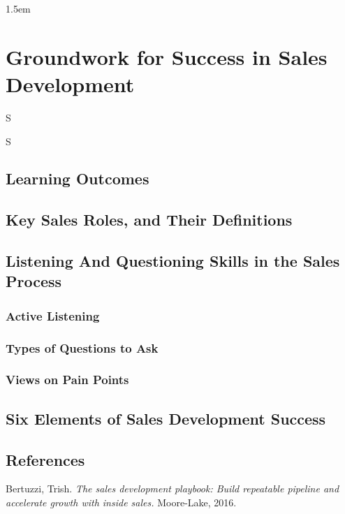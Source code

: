\frenchspacing
{1.5em}
\chapter{Groundwork for Success in Sales Development}
\epigraph{S}{S}

%
\section{Learning Outcomes}
%
\section{Key Sales Roles, and Their Definitions}

%
\section{Listening And Questioning Skills in the Sales Process}
\subsection{Active Listening}
\subsection{Types of Questions to Ask}
\subsection{Views on Pain Points}

% 
\section{Six Elements of Sales Development Success}

%
\section{References}
Bertuzzi, Trish. \textit{The sales development playbook: Build repeatable pipeline and accelerate growth with inside sales.} Moore-Lake, 2016.